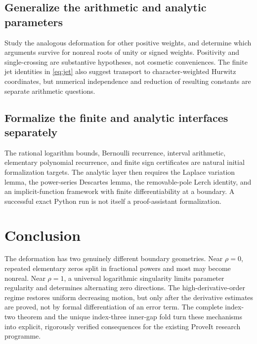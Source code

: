 \documentclass[11pt,letterpaper]{article}
\numberwithin{equation}{section}
\theoremstyle{definition}\newtheorem{definition}[theorem]{Definition}
\theoremstyle{remark}\newtheorem{remark}[theorem]{Remark}
\begin{document}
\subsection{Generalize the arithmetic and analytic parameters}
Study the analogous deformation for other positive weights, and determine which arguments survive for nonreal roots of unity or signed weights. Positivity and single-crossing are substantive hypotheses, not cosmetic conveniences. The finite jet identities in \eqref{eq:jet} also suggest transport to character-weighted Hurwitz coordinates, but numerical independence and reduction of resulting constants are separate arithmetic questions.

\subsection{Formalize the finite and analytic interfaces separately}
The rational logarithm bounds, Bernoulli recurrence, interval arithmetic, elementary polynomial recurrence, and finite sign certificates are natural initial formalization targets. The analytic layer then requires the Laplace variation lemma, the power-series Descartes lemma, the removable-pole Lerch identity, and an implicit-function framework with finite differentiability at a boundary. A successful exact Python run is not itself a proof-assistant formalization.

\section*{Conclusion}
The deformation has two genuinely different boundary geometries. Near $\rho=0$, repeated elementary zeros split in fractional powers and most may become nonreal. Near $\rho=1$, a universal logarithmic singularity limits parameter regularity and determines alternating zero directions. The high-derivative-order regime restores uniform decreasing motion, but only after the derivative estimates are proved, not by formal differentiation of an error term. The complete index-two theorem and the unique index-three inner-gap fold turn these mechanisms into explicit, rigorously verified consequences for the existing ProveIt research programme.
\end{document}
